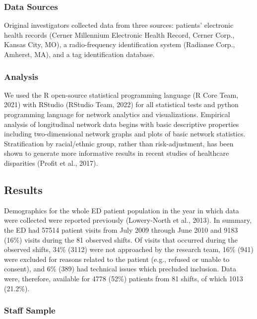 \documentclass[
]{article}
\begin{document}
\hypertarget{data-sources}{%
\subsubsection{Data Sources}\label{data-sources}}

Original investigators collected data from three sources: patients'
electronic health records (Cerner Millennium Electronic Health Record,
Cerner Corp., Kansas City, MO), a radio-frequency identification system
(Radianse Corp., Amherst, MA), and a tag identification database.

\hypertarget{analysis}{%
\subsubsection{Analysis}\label{analysis}}

We used the R open-source statistical programming language (R Core Team,
2021) with RStudio (RStudio Team, 2022) for all statistical tests and
python programming language for network analytics and visualizations.
Empirical analysis of longitudinal network data begins with basic
descriptive properties including two-dimensional network graphs and
plots of basic network statistics. Stratification by racial/ethnic
group, rather than risk-adjustment, has been shown to generate more
informative results in recent studies of healthcare disparities (Profit
et al., 2017).

\hypertarget{results}{%
\subsection{Results}\label{results}}

Demographics for the whole ED patient population in the year in which
data were collected were reported previously (Lowery-North et al.,
2013). In summary, the ED had 57514 patient visits from July 2009
through June 2010 and 9183 (16\%) visits during the 81 observed shifts.
Of visits that occurred during the observed shifts, 34\% (3112) were not
approached by the research team, 16\% (941) were excluded for reasons
related to the patient (e.g., refused or unable to consent), and 6\%
(389) had technical issues which precluded inclusion. Data were,
therefore, available for 4778 (52\%) patients from 81 shifts, of which
1013 (21.2\%).

\hypertarget{staff-sample}{%
\subsubsection{Staff Sample}\label{staff-sample}}
\end{document}
